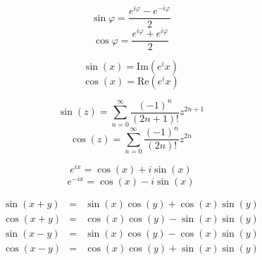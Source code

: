\begin{multicols}{2}

$$\sin \varphi = \frac{e^{i \varphi} - e^{-i \varphi}}{2}$$
$$\cos \varphi = \frac{e^{i \varphi} + e^{i \varphi}}{2}$$

$$\sin (x) = \mathrm{Im} (e^ix)$$
$$\cos (x) = \mathrm{Re} (e^ix)$$

$$\sin (z) = \sum_{n=0}^\infty \frac{(-1)^n}{(2n + 1)!} z^{2n+1}$$
$$\cos (z) = \sum_{n=0}^\infty \frac{(-1)^n}{(2n)!} z^{2n}$$

$$e^{ix} = \cos (x) + i \sin (x)$$
$$e^{-ix} = \cos (x) - i \sin (x)$$

\end{multicols}

\begin{eqnarray*}
\sin (x + y) & = & \sin (x) \cos (y) + \cos (x) \sin (y) \\
\cos (x + y) & = & \cos (x) \cos (y) - \sin (x) \sin (y) \\
\sin (x - y) & = & \sin (x) \cos (y) - \cos (x) \sin (y) \\
\cos (x - y) & = & \cos (x) \cos (y) + \sin (x) \sin (y) \\
\end{eqnarray*}

